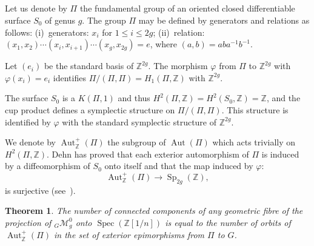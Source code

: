 \documentclass[10pt]{amsart}
\theoremstyle{plain}
\newtheorem{theorem}{Theorem}[section]
\theoremstyle{definition}
\DeclareMathOperator{\Aut}{Aut}
\DeclareMathOperator{\Spec}{Spec}
\DeclareMathOperator{\Sp}{Sp}
\begin{document}
\subsection*{}

Let us denote by $\Pi$ the fundamental group of an oriented closed differentiable surface $S_0$ of genus $g$. The group $\Pi$ may be defined by generators and relations as follows: (i)~generators: $x_i$ for $1 \leq i \leq 2g$; (ii)~relation: $(x_1, x_2) \cdots (x_i, x_{i+1}) \cdots (x_g, x_{2g}) = e$, where $(a,b) = aba^{-1}b^{-1}$.

Let $(e_i)$ be the standard basis of $\mathbb{Z}^{2g}$. The morphism $\varphi$ from $\Pi$ to $\mathbb{Z}^{2g}$ with $\varphi(x_i) = e_i$ identifies $\Pi/(\Pi, \Pi) = H_1(\Pi, \mathbb{Z})$ with $\mathbb{Z}^{2g}$.

The surface $S_0$ is a $K(\Pi, 1)$ and thus $H^2(\Pi, \mathbb{Z}) = H^2(S_0, \mathbb{Z}) = \mathbb{Z}$, and the cup product defines a symplectic structure on $\Pi/(\Pi, \Pi)$. This structure is identified by $\varphi$ with the standard symplectic structure of $\mathbb{Z}^{2g}$.

We denote by $\Aut_{\mathbb{Z}}^+(\Pi)$ the subgroup of $\Aut(\Pi)$ which acts trivially on $H^2(\Pi, \mathbb{Z})$. Dehn has proved that each exterior automorphism of $\Pi$ is induced by a diffeomorphism of $S_0$ onto itself and that the map induced by $\varphi$:
\[
\Aut_{\mathbb{Z}}^+(\Pi) \longrightarrow \Sp_{2g}(\mathbb{Z}),
\]
is surjective (see~\cite{Ma}).

\begin{theorem}\label{thm:5.13}
The number of connected components of any geometric fibre of the projection of $_G\mathscr{M}_g^0$ onto $\Spec(\mathbb{Z}[1/n])$ is equal to the number of orbits of $\Aut_{\mathbb{Z}}^+(\Pi)$ in the set of exterior epimorphisms from $\Pi$ to $G$.
\end{theorem}
\end{document}
